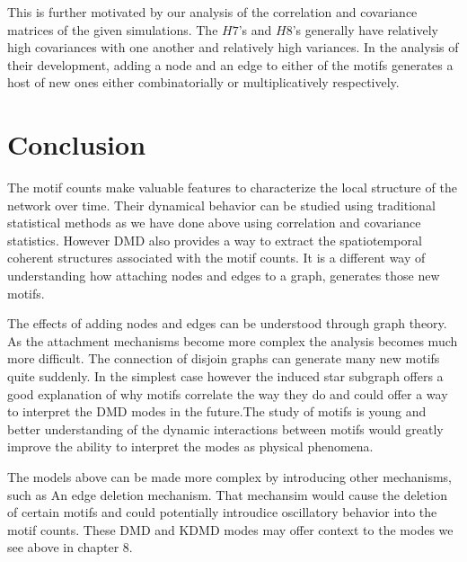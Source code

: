 This is further motivated by our analysis of the correlation and covariance
matrices of the given simulations. The $H7$'s and $H8$'s generally have 
relatively high covariances with one another and relatively high variances.
In the analysis of their development, adding a node and an edge to either of the
motifs generates a host of new ones either combinatorially or multiplicatively 
respectively. 

\chapter{Conclusion}

The motif counts make valuable features to characterize the local structure 
of the network over time. Their dynamical behavior can be studied using
traditional statistical methods as we have done above using correlation
and covariance statistics. However DMD also provides a way to extract 
the spatiotemporal coherent structures associated with the motif counts. It 
is a different way of understanding how attaching nodes and edges to a graph,
generates those new motifs. 

The effects of adding nodes and edges can be understood through graph theory. As
the attachment mechanisms become more complex the analysis becomes much more
difficult. The connection of disjoin graphs can generate many new motifs quite
suddenly. In the simplest case however the induced star subgraph offers 
a good explanation of why motifs correlate the way they do and could 
offer a way to interpret the DMD modes in the future.The study 
of motifs is young and better understanding of the dynamic interactions 
between motifs would greatly improve the ability to interpret the modes as physical
phenomena. 

The models above can be made more complex by introducing other mechanisms, such as An
edge deletion mechanism. That mechansim would cause the deletion of certain motifs and 
could potentially introudice oscillatory behavior into the motif counts. These
DMD and KDMD modes may offer context to the modes we see above in chapter 8. 


